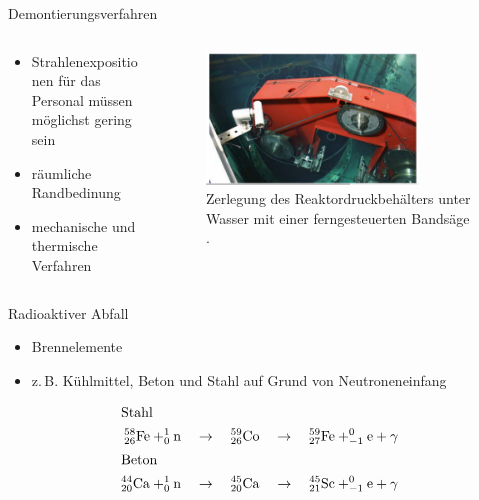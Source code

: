 \begin{frame}{Demontierungsverfahren}
  \begin{columns}

    \begin{column}{0.48\textwidth}
    \begin{itemize}
      \setlength\itemsep{1.2em}
      \item{Strahlenexpositionen für das Personal müssen möglichst gering sein }
      \item{ räumliche Randbedinung }
      \item{ mechanische und thermische Verfahren }

    \end{itemize}

    \end{column}

    \begin{column}{0.48\textwidth}
      \begin{figure}
         \centering
         \includegraphics[width=0.8\textwidth]{./bilder/zerlegung_bandsaege.PNG}
         \caption{Zerlegung des Reaktordruckbehälters unter Wasser mit einer ferngesteuerten Bandsäge \cite{stilllegung_grs}. }
         \label{ fig: abbau_roboter}
       \end{figure}
    \end{column}

  \end{columns}
\end{frame}



\begin{frame}{Radioaktiver Abfall}
  \begin{itemize}
    \setlength\itemsep{1.2em}
    \item{Brennelemente}
    \item{z.\,B. Kühlmittel, Beton und Stahl auf Grund von Neutroneneinfang}
  \end{itemize}
  \begin{align*}
    \shortintertext{Stahl}
    ^{58}_{26}\ce{Fe}+ ^1_0\mathrm{n }\quad &\rightarrow \quad  ^{59}_{26}\ce{Co} \quad \rightarrow \quad ^{59}_{27}\ce{Fe} + _{-1}^{0}\ce{e}+\gamma \\
  \shortintertext{Beton}
    ^{44}_{20}\ce{Ca}+ ^1_0\mathrm{n }\quad &\rightarrow \quad  ^{45}_{20}\ce{Ca} \quad \rightarrow \quad ^{45}_{21}\ce{Sc} + _{-1}^{0}\ce{e}+\gamma
  \end{align*}
\end{frame}



